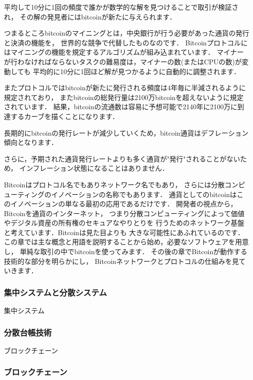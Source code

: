 \documentclass[a4paper,12pt]{jsarticle}
\begin{document}
平均して10分に1回の頻度で誰かが数学的な解を見つけることで取引が検証され，
その解の発見者にはbitcoinが新たに与えられます．

つまるところbitcoinのマイニングとは，中央銀行が行う必要があった通貨の発行と決済の機能を，
世界的な競争で代替したものなのです．
Bitcoinプロトコルにはマイニングの機能を規定するアルゴリズムが組み込まれています．
マイナーが行わなければならないタスクの難易度は，マイナーの数(またはCPUの数)が変動しても
平均的に10分に1回ほど解が見つかるように自動的に調整されます．

またプロトコルではbitcoinが新たに発行される頻度は4年毎に半減されるように規定されており，
またbitcoinの総発行量は2100万bitcoinを超えないように規定されています．
結果，bitcoinの流通数は容易に予想可能で2140年に2100万に到達するカーブを描くことになります．

長期的にbitcoinの発行レートが減少していくため，bitcoin通貨はデフレーション傾向となります．

さらに，予期された通貨発行レートよりも多く通貨が"発行"されることがないため，
インフレーション状態になることはありません．

Bitcoinはプロトコル名でもありネットワーク名でもあり，
さらには分散コンピューティングのイノベーションの名称でもあります．
通貨としてのbitcoinはこのイノベーションの単なる最初の応用であるだけです．
開発者の視点から，Bitcoinを通貨のインターネット，
つまり分散コンピューティングによって価値やデジタル資産の所有権のセキュアなやりとりを
行うためのネットワーク基盤と考えています．Bitcoinは見た目よりも
大きな可能性にあふれているのです．
この章では主な概念と用語を説明することから始め，必要なソフトウェアを用意し，
単純な取引の中でbitcoinを使ってみます．
その後の章でBitcoinが動作する技術的な部分を明らかにし，
Bitcoinネットワークとプロトコルの仕組みを見ていきます．

      \subsubsection{集中システムと分散システム}
集中システム


      \subsubsection{分散台帳技術}
ブロックチェーン

      \subsubsection{ブロックチェーン}
\end{document}

